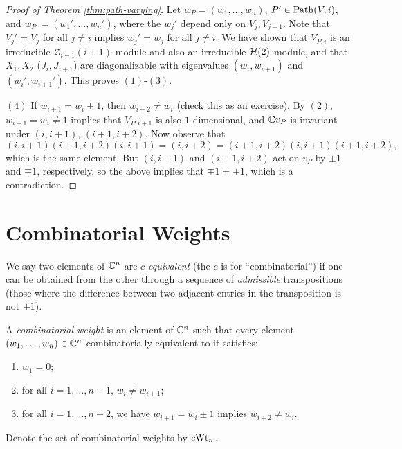 \begin{proof}[Proof of Theorem \ref{thm:path-varying}]
  Let $w_P = (w_1, \dots, w_n)$,
  $P' \in \operatorname{Path}(V, i)$, and
  $w_{P'} = (w_1', \dots, w_n')$,
  where the $w_j'$ depend only on
  $V_j, V_{j - 1}$. Note that 
  $V_j' = V_j$ for all $j \ne i$ implies
  $w_j' = w_j$ for all $j \ne i$. We
  have shown that $V_{P, i}$ is an
  irreducible $\mathcal{Z}_{i - 1}(i + 1)$-module
  and also an irreducible
  $\mathcal{H}(2)$-module, and that
  $X_1, X_2$ ($J_i, J_{i + 1}$) are
  diagonalizable with
  eigenvalues $(w_i, w_{i + 1})$
  and $(w_i', w_{i + 1}')$.
  This proves $(1)$-$(3)$.

  $(4)$ If $w_{i + 1} = w_i \pm 1$, then
  $w_{i + 2} \ne w_i$ (check this
  as an exercise).
  By $(2)$, $w_{i + 1} = w_i \ne 1$
  implies that $V_{P, i + 1}$ is also
  $1$-dimensional, and
  $\mathbb{C} v_P$ is invariant under
  $(i, i + 1)$, $(i + 1, i + 2)$. Now
  observe that
  \[
    (i, i + 1)(i + 1, i + 2)(i, i + 1)
    = (i, i + 2)
    = (i + 1, i + 2)(i, i + 1)(i + 1, i + 2),
  \]
  which is the same element. But
  $(i, i + 1)$ and $(i + 1, i + 2)$
  act on $v_P$ by $\pm 1$ and $\mp 1$,
  respectively, so the above implies
  that $\mp 1 = \pm 1$, which is a
  contradiction.
\end{proof}

\section{Combinatorial Weights}

\begin{definition}
  We say two elements of $\mathbb{C}^n$
  are \emph{$c$-equivalent} (the
  $c$ is for ``combinatorial'')
  if one can be obtained from the other
  through a sequence of \emph{admissible}
  transpositions (those where the difference
  between two adjacent entries in the
  transposition is not $\pm 1$).
\end{definition}

\begin{definition}
  A \emph{combinatorial weight}
  is an element of $\mathbb{C}^n$ such that
  every element $(w_1, \dots, w_n) \in \mathbb{C}^n$ combinatorially
  equivalent to it satisfies:
  \begin{enumerate}
    \item $w_1 = 0$;
    \item for all $i = 1, \dots, n - 1$,
      $w_i \ne w_{i + 1}$;
    \item for all $i = 1, \dots, n - 2$,
      we have $w_{i + 1} = w_{i} \pm 1$
      implies $w_{i + 2} \ne w_i$.
  \end{enumerate}
  Denote the set of combinatorial weights
  by $c{\operatorname{Wt}_n}$.
\end{definition}

